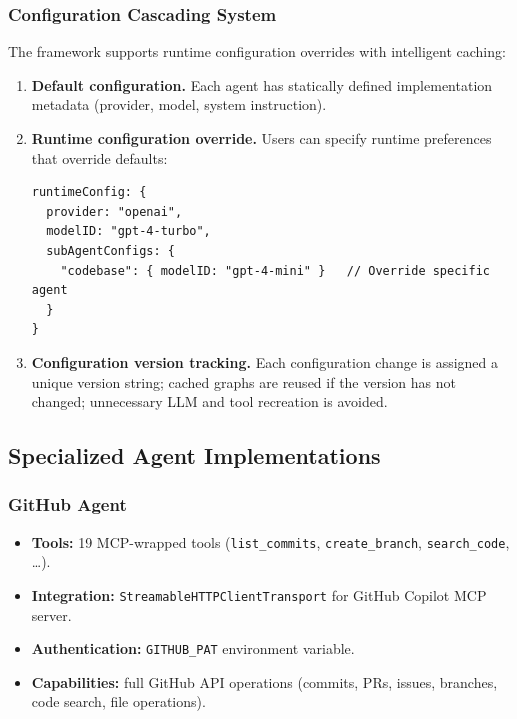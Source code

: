 \documentclass[11pt,a4paper]{report}
\newcommand{\code}[1]{\texttt{\small #1}}
\begin{document}
\subsubsection{Configuration Cascading System}

The framework supports runtime configuration overrides with intelligent caching:

\begin{enumerate}
  \item \textbf{Default configuration.} Each agent has statically defined implementation metadata (provider, model, system instruction).
  \item \textbf{Runtime configuration override.} Users can specify runtime preferences that override defaults:
\begin{lstlisting}[style=tsstyle]
runtimeConfig: {
  provider: "openai",
  modelID: "gpt-4-turbo",
  subAgentConfigs: {
    "codebase": { modelID: "gpt-4-mini" }   // Override specific agent
  }
}
\end{lstlisting}
  \item \textbf{Configuration version tracking.} Each configuration change is assigned a unique version string; cached graphs are reused if the version has not changed; unnecessary LLM and tool recreation is avoided.
\end{enumerate}

\subsection{Specialized Agent Implementations}

\subsubsection{GitHub Agent}
\begin{itemize}
  \item \textbf{Tools:} 19 MCP-wrapped tools (\code{list\_commits}, \code{create\_branch}, \code{search\_code}, \dots).
  \item \textbf{Integration:} \code{StreamableHTTPClientTransport} for GitHub Copilot MCP server.
  \item \textbf{Authentication:} \code{GITHUB\_PAT} environment variable.
  \item \textbf{Capabilities:} full GitHub API operations (commits, PRs, issues, branches, code search, file operations).
\end{itemize}
\end{document}

